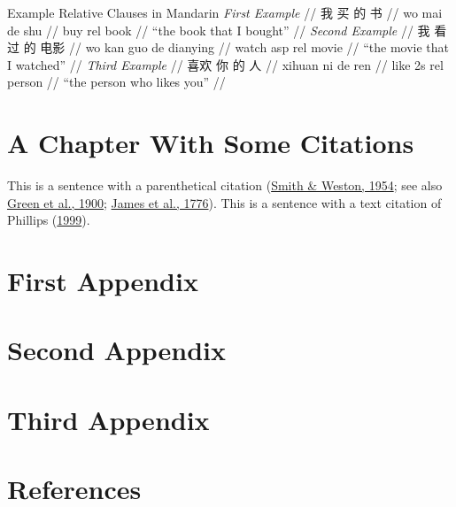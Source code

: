 \documentclass[
  12pt,
  letterpaper,
]{report}
\begin{document}
\pex[everygla=\zh]
Example Relative Clauses in Mandarin
\a 
\begingl
\glpreamble \textit{First Example} //
\gla 我 买 的 书 // 
\glb wo mai de shu //
 buy {\sc rel} book //
\glft “the book that I bought” // 
\endgl 
\a 
\begingl
\glpreamble \textit{Second Example} //
\gla 我 看 过 的 电影  // 
\glb wo kan guo de dianying //
 watch {\sc asp} {\sc rel} movie //
\glft “the movie that I watched” // 
\endgl 
\a 
\begingl
\glpreamble \textit{Third Example} //
\gla 喜欢 你 的 人 // 
\glb xihuan ni de ren  //
\glc like {\sc 2s} {\sc rel} person //
\glft “the person who likes you” //
\endgl 
\xe

\hypertarget{a-chapter-with-some-citations}{%
\chapter{A Chapter With Some
Citations}\label{a-chapter-with-some-citations}}

This is a sentence with a parenthetical citation
(\protect\hyperlink{ref-smit54}{Smith \& Weston, 1954}; see also
\protect\hyperlink{ref-gree00}{Green et al., 1900};
\protect\hyperlink{ref-jame76}{James et al., 1776}). This is a sentence
with a text citation of Phillips (\protect\hyperlink{ref-phil99}{1999}).

\cleardoublepage
{}
{}
\appendix

\hypertarget{first-appendix}{%
\chapter{First Appendix}\label{first-appendix}}

\setlength{\parindent}{0in}
\singlespacing

\hypertarget{second-appendix}{%
\chapter{Second Appendix}\label{second-appendix}}

\hypertarget{third-appendix}{%
\chapter{Third Appendix}\label{third-appendix}}

\hypertarget{references}{%
\chapter*{References}\label{references}}
\end{document}
